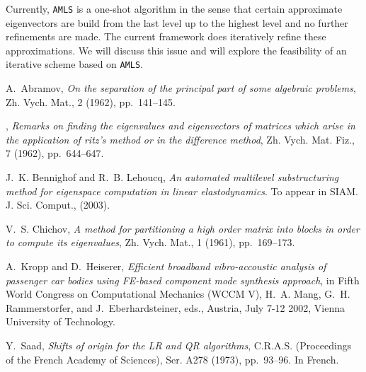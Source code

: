 \documentclass{report}
\begin{document}
Currently, {\tt AMLS} is a one-shot algorithm in the sense that certain
approximate eigenvectors are build from the last level up to the highest
level and no further refinements are made. The current framework does
iteratively refine these approximations. We will
discuss this issue and will explore the feasibility of an iterative
scheme based on {\tt AMLS}.



\begin{thebibliography}{10}

{\sc A.~Abramov}, {\em On the separation of the principal part of some
algebraic problems}, Zh. Vych. Mat., 2 (1962), pp.~141--145.

\leavevmode\vrule height 2pt depth -1.6pt width 23pt, {\em Remarks on
finding the eigenvalues and eigenvectors of matrices which arise in the
application of ritz's method or in the difference method}, Zh. Vych. Mat.
Fiz., 7 (1962), pp.~644--647.

{\sc J.~K. Bennighof and R.~B. Lehoucq}, {\em An automated multilevel
substructuring method for eigenspace computation in linear
elastodynamics}. To appear in SIAM. J. Sci. Comput., (2003).

 {\sc V.~S. Chichov}, {\em A method for partitioning a
high order matrix into blocks in order to compute its eigenvalues}, Zh.
Vych. Mat., 1 (1961), pp.~169--173.


{\sc A.~Kropp and D.~Heiserer}, {\em Efficient broadband vibro-accoustic
analysis of passenger car bodies using {FE}-based component mode
synthesis approach}, in Fifth World Congress on Computational Mechanics
(WCCM V), H.~A. Mang, G.~H. Rammerstorfer, and J.~Eberhardsteiner, eds.,
Austria, July 7-12
2002, Vienna University of Technology.

{\sc Y.~Saad}, {\em Shifts of origin for the {LR} and {QR} algorithms},
C.R.A.S. (Proceedings of the French Academy of Sciences), Ser. A278
(1973), pp.~93--96.
\newblock In French.



\end{thebibliography}
\end{document}
